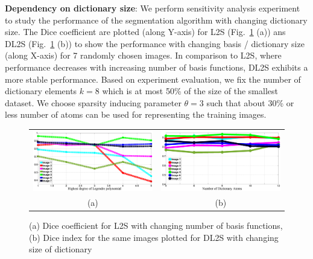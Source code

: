 \textbf{Dependency on dictionary size}: We perform sensitivity analysis experiment to study the performance of the segmentation algorithm  with changing dictionary size. The Dice coefficient are plotted (along Y-axis) for L2S \cite{mukherjee_L2S} (Fig.~\ref{fig:quant_compPolydeg} (a)) ans DL2S (Fig.~\ref{fig:quant_compPolydeg} (b)) to show the performance with changing basis / dictionary size (along X-axis) for 7 randomly chosen images. In comparison to L2S, where performance decreases with increasing number of basis functions, DL2S exhibits a more stable performance. Based on experiment evaluation, we fix the number of dictionary elements $k=8$ which is at most 50\% of the size of the smallest dataset. We choose sparsity inducing parameter $\theta=3$ such that about 30\% or less number of atoms can be used for representing the training images.
\begin{figure}[t]
\centering
\renewcommand{\tabcolsep}{0.05cm}
\begin{tabular}{cc}
	\includegraphics[width=.48\linewidth]{./images/DL2S/legnum_comp}  &
	\includegraphics[width=.48\linewidth]{./images/DL2S/dictnum_comp} 
	\\
	\scriptsize(a) & \scriptsize(b)
\end{tabular}
\caption[DL2S comparison of basis elements]{(a) Dice coefficient for L2S with changing number of basis functions, (b) Dice index for the same images plotted for DL2S with changing size of dictionary}
\label{fig:quant_compPolydeg}
\end{figure}

